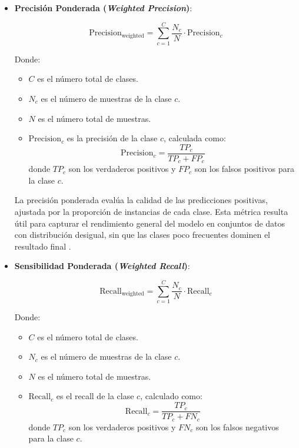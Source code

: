 \begin{itemize}

\item \textbf{Precisión Ponderada (\textit{Weighted Precision})}:

\begin{equation}
\text{Precision}_{\text{weighted}} = \sum_{c=1}^{C} \frac{N_c}{N} \cdot \text{Precision}_c
\end{equation}

Donde:
\begin{itemize}
    \item \( C \) es el número total de clases.
    \item \( N_c \) es el número de muestras de la clase \( c \).
    \item \( N \) es el número total de muestras.
    \item \( \text{Precision}_c \) es la precisión de la clase \( c \), calculada como:
    \[
    \text{Precision}_c = \frac{TP_c}{TP_c + FP_c}
    \]
    donde \( TP_c \) son los verdaderos positivos y \( FP_c \) son los falsos positivos para la clase \( c \).
\end{itemize}


La precisión ponderada evalúa la calidad de las predicciones positivas, ajustada por la proporción de instancias de cada clase. Esta métrica resulta útil para capturar el rendimiento general del modelo en conjuntos de datos con distribución desigual, sin que las clases poco frecuentes dominen el resultado final \cite{Girosi2004}.

\item \textbf{Sensibilidad Ponderada (\textit{Weighted Recall})}:

\begin{equation}
\text{Recall}_{\text{weighted}} = \sum_{c=1}^{C} \frac{N_c}{N} \cdot \text{Recall}_c
\end{equation}

Donde:
\begin{itemize}
    \item \( C \) es el número total de clases.
    \item \( N_c \) es el número de muestras de la clase \( c \).
    \item \( N \) es el número total de muestras.
    \item \( \text{Recall}_c \) es el recall de la clase \( c \), calculado como:
    \[
    \text{Recall}_c = \frac{TP_c}{TP_c + FN_c}
    \]
    donde \( TP_c \) son los verdaderos positivos y \( FN_c \) son los falsos negativos para la clase \( c \).
\end{itemize}


\end{itemize}
